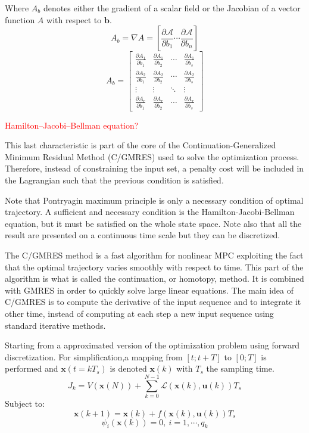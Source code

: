 \documentclass[a4paper, 12pt]{report}
\begin{document}
Where $A_b$ denotes either the gradient of a scalar field or the Jacobian of a vector function $A$ with respect to $\boldsymbol{b}$.
\[ A_b = \nabla A = \left [ \frac{\partial \mathcal{A}}{\partial b_1} \cdots \frac{\partial \mathcal{A}}{\partial b_n} \right ] \]
\[ A_b =  \begin{bmatrix} \frac{\partial A_1}{\partial b_1} & \frac{\partial A_1}{\partial b_2} & \cdots & \frac{\partial A_1}{\partial b_s}  \\ 
 \frac{\partial A_2}{\partial b_1} &  \frac{\partial A_2}{\partial b_2} & \cdots & \frac{\partial A_2}{\partial b_s}  \\ 
 \vdots &  \vdots & \ddots & \vdots  \\ 
 \frac{\partial A_r}{\partial b_1} &  \frac{\partial A_r}{\partial b_2} & \cdots & \frac{\partial A_r}{\partial b_s} \end{bmatrix}  \]
 
 \textcolor{red}{Hamilton–Jacobi–Bellman equation?}

This last characteristic is part of the core of the Continuation-Generalized Minimum Residual Method (C/GMRES)\cite{Ohtsuka2004} used to solve the optimization process. Therefore, instead of constraining the input set, a penalty cost will be included in the Lagrangian such that the previous condition is satisfied.

Note that Pontryagin maximum principle is only a necessary condition of optimal trajectory. A sufficient and necessary condition is the Hamilton-Jacobi-Bellman equation, but it must be satisfied on the whole state space. Note also that all the result are presented on a continuous time scale but they can be discretized.

The C/GMRES method is a fast algorithm for nonlinear MPC exploiting the fact that the optimal trajectory varies smoothly with respect to time. This part of the algorithm is what is called the continuation, or homotopy, method. It is combined with GMRES in order to quickly solve large linear equations. The main idea of C/GMRES is to compute the derivative of the input sequence and to integrate it other time, instead of computing at each step a new input sequence using standard iterative methods.

Starting from a approximated version of the optimization problem using forward discretization. For simplification,a mapping from $[t; t+T]$ to $[0; T]$ is performed and $\boldsymbol{x}(t = kT_s)$ is denoted $\boldsymbol{x}(k)$ with $T_s$ the sampling time.
\[ J_k = V(\boldsymbol{x}(N)) + \sum_{k = 0}^{N-1} \mathcal{L}(\boldsymbol{x}(k), \boldsymbol{u}(k))T_s \]
Subject to:
\[ \boldsymbol{x}(k+1) = \boldsymbol{x}(k) + f(\boldsymbol{x}(k),\boldsymbol{u}(k))T_s \]
\[ \psi_i(\boldsymbol{x}(k)) = 0,\ i = 1, \cdots, q_k \]
\end{document}
